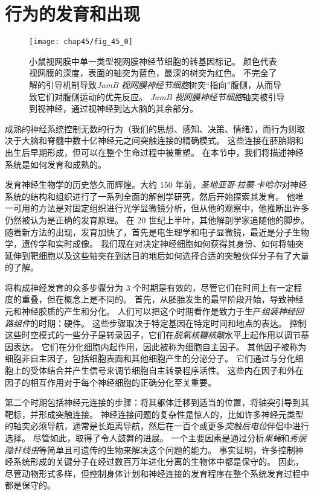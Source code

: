 \part{行为的发育和出现}

\begin{figure}[htbp]
	\centering
	\texttt{[image: chap45/fig\_45\_0]}
	\caption{小鼠视网膜中单一类型视网膜神经节细胞的转基因标记。
		颜色代表视网膜的深度，表面的轴突为蓝色，最深的树突为红色。
		不完全了解的引导机制导致\textit{JamB 视网膜神经节细胞}树突“指向”腹侧，从而导致它们对腹侧运动的优先反应。
		\textit{JamB 视网膜神经节细胞}轴突被引导到视神经，通过视神经到达大脑的其余部分。}
	\label{fig:45_0}
\end{figure}


成熟的神经系统控制无数的行为（我们的思想、感知、决策、情绪），而行为则取决于大脑和脊髓中数十亿神经元之间突触连接的精确模式。
这些连接在胚胎期和出生后早期形成，但可以在整个生命过程中被重塑。
在本节中，我们将描述神经系统是如何发育和成熟的。


发育神经生物学的历史悠久而辉煌。大约 150 年前，\textit{圣地亚哥$\cdot$拉蒙$\cdot$卡哈尔}对神经系统的结构和组织进行了一系列全面的解剖学研究，然后开始探索其发育。
他唯一可用的方法是对固定组织进行光学显微镜分析，但从他的观察中，他推断出许多仍然被认为是正确的发育原理。
在 20 世纪上半叶，其他解剖学家追随他的脚步。
随着新方法的出现，发育加快了，首先是电生理学和电子显微镜，最近是分子生物学，遗传学和实时成像。
我们现在对决定神经细胞如何获得其身份、如何将轴突延伸到靶细胞以及这些轴突在到达目的地后如何选择合适的突触伙伴分子有了大量的了解。


将构成神经发育的众多步骤分为 3 个时期是有效的，尽管它们在时间上有一定程度的重叠，但在概念上是不同的。
首先，从胚胎发生的最早阶段开始，导致神经元和神经胶质的产生和分化。
人们可以把这个时期看作是致力于生产\textit{组装神经回路组件}的时期：硬件。
这些步骤取决于特定基因在特定时间和地点的表达。
控制这些时空模式的一些分子是转录因子，它们在\textit{脱氧核糖核酸}水平上起作用以调节基因表达。
它们在分化细胞内起作用，因此被称为细胞自主因子。
其他因子被称为细胞非自主因子，包括细胞表面和其他细胞产生的分泌分子。
它们通过与分化细胞上的受体结合并产生信号来调节细胞自主转录程序活性。
这些内在因子和外在因子的相互作用对于每个神经细胞的正确分化至关重要。


第二个时期包括神经元连接的步骤：将其躯体迁移到适当的位置，将轴突引导到其靶标，并形成突触连接。
神经连接问题的复杂性是惊人的，比如许多神经元类型的轴突必须导航，通常是长距离导航，然后在一百个或更多\textit{突触后电位}伴侣中进行选择。
尽管如此，取得了令人鼓舞的进展。
一个主要因素是通过分析\textit{果蝇}和\textit{秀丽隐杆线虫}等简单且可遗传的生物来解决这个问题的能力。
事实证明，许多控制神经系统形成的关键分子在经过数百万年进化分离的生物体中都是保守的。
因此，尽管动物形式多样，但控制身体计划和神经连接的发育程序在整个系统发育过程中都是保守的。


